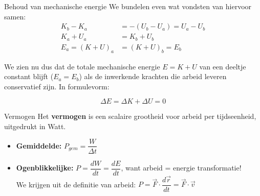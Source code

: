 \newpage

\begin{lem}{Behoud van mechanische energie}
    We bundelen even wat vondsten van hiervoor samen:
    \begin{align*}
        K_b - K_a &= -(U_b - U_a) = U_a - U_b \\
        K_a + U_a &= K_b + U_b \\ 
        E_a = (K + U)_a &= (K + U)_b = E_b
    \end{align*}
    
    \noindent We zien nu dus dat de totale mechanische energie $ E = K + U $ van een deeltje constant blijft ($ E_a = E_b $) als de inwerkende krachten die arbeid leveren conservatief zijn. In formulevorm:
    
    \begin{equation*}
        \Delta E = \Delta K + \Delta U = 0
    \end{equation*}
    \vspace{-0.5cm}
\end{lem}


    
    
    

\begin{theo}[Vermogen]{Vermogen}
    Het \textbf{vermogen} is een scalaire grootheid voor arbeid per tijdseenheid, uitgedrukt in Watt.
    \begin{itemize}
        \item \textbf{Gemiddelde:} $ P_{gem} = \dfrac{W}{\Delta t} $ 
        \item \textbf{Ogenblikkelijke:} $ P = \dfrac{dW}{dt} = \dfrac{dE}{dt} $, want arbeid = energie transformatie! \\
        We krijgen uit de definitie van arbeid: $ P = \Vec{F} \cdot \dfrac{d\Vec{r}}{dt} = \Vec{F} \cdot \Vec{v} $
    \end{itemize}
\end{theo}
